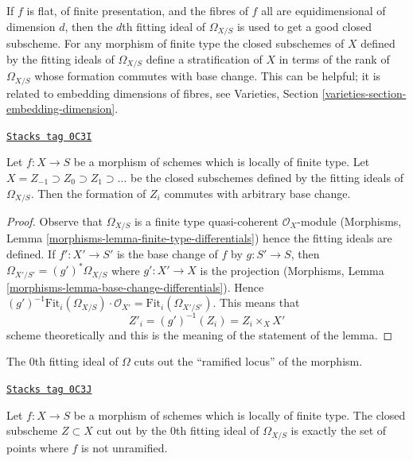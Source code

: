 \medskip\noindent
If $f$ is flat, of finite presentation, and the fibres of $f$
all are equidimensional of dimension $d$, then the $d$th fitting ideal
of $\Omega_{X/S}$ is used to get a good closed subscheme. For any
morphism of finite type the closed subschemes of $X$ defined by the
fitting ideals of $\Omega_{X/S}$ define a stratification of $X$
in terms of the rank of $\Omega_{X/S}$  whose formation commutes with
base change. This can be helpful; it is related to embedding dimensions of
fibres, see Varieties, Section \ref{varieties-section-embedding-dimension}.

\begin{lemma}
\label{divisors-lemma-base-change-and-fitting-ideal-omega}
\href{https://stacks.math.columbia.edu/tag/0C3I}{\texttt{Stacks tag 0C3I}}

Let $f : X \to S$ be a morphism of schemes which is locally of finite type.
Let $X = Z_{-1} \supset Z_0 \supset Z_1 \supset \ldots$
be the closed subschemes defined by the fitting ideals
of $\Omega_{X/S}$. Then the formation of $Z_i$ commutes
with arbitrary base change.
\end{lemma}

\begin{proof}
Observe that $\Omega_{X/S}$ is a finite type quasi-coherent
$\mathcal{O}_X$-module
(Morphisms, Lemma \ref{morphisms-lemma-finite-type-differentials})
hence the fitting ideals are defined. If $f' : X' \to S'$
is the base change of $f$ by $g : S' \to S$, then
$\Omega_{X'/S'} = (g')^*\Omega_{X/S}$ where $g' : X' \to X$
is the projection
(Morphisms, Lemma \ref{morphisms-lemma-base-change-differentials}).
Hence $(g')^{-1}\text{Fit}_i(\Omega_{X/S}) \cdot \mathcal{O}_{X'} =
\text{Fit}_i(\Omega_{X'/S'})$. This means that
$$
Z'_i = (g')^{-1}(Z_i) = Z_i \times_X X'
$$
scheme theoretically and this is the meaning of the statement of
the lemma.
\end{proof}

The $0$th fitting ideal of $\Omega$
cuts out the ``ramified locus'' of the morphism.

\begin{lemma}
\label{divisors-lemma-zero-fitting-ideal-omega-unramified}
\href{https://stacks.math.columbia.edu/tag/0C3J}{\texttt{Stacks tag 0C3J}}

Let $f : X \to S$ be a morphism of schemes which is locally of finite type.
The closed subscheme $Z \subset X$ cut out by the $0$th fitting ideal of
$\Omega_{X/S}$ is exactly the set of points where $f$ is not unramified.
\end{lemma}

